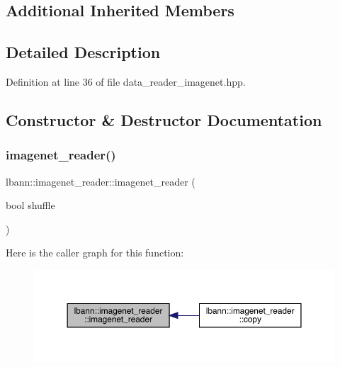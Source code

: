 \subsection*{Additional Inherited Members}


\subsection{Detailed Description}


Definition at line 36 of file data\+\_\+reader\+\_\+imagenet.\+hpp.



\subsection{Constructor \& Destructor Documentation}
\mbox{\label{classlbann_1_1imagenet__reader_a642331b94cdc3caad8335d65d096141c}} 
\subsubsection{\texorpdfstring{imagenet\+\_\+reader()}{imagenet\_reader()}\hspace{0.1cm}{\footnotesize\ttfamily [1/3]}}
{\footnotesize\ttfamily lbann\+::imagenet\+\_\+reader\+::imagenet\+\_\+reader (\begin{DoxyParamCaption}\item[{bool}]{shuffle }\end{DoxyParamCaption})\hspace{0.3cm}{\ttfamily [delete]}}

Here is the caller graph for this function\+:\nopagebreak
\begin{figure}[H]
\begin{center}
\leavevmode
\includegraphics[width=350pt]{classlbann_1_1imagenet__reader_a642331b94cdc3caad8335d65d096141c_icgraph}
\end{center}
\end{figure}
\mbox{\label{classlbann_1_1imagenet__reader_abf46c9cf51a7e046173a0046fb0ad08a}} 
